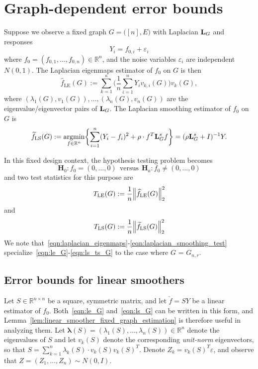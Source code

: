 \documentclass{article}
\newcommand{\Reals}{\mathbb{R}}
\newcommand{\1}{\mathbf{1}}
\DeclareMathOperator*{\argmin}{argmin}
\newcommand{\lambdavec}{\boldsymbol{\lambda}}
\newcommand{\Lap}{{\bf L}}
\newcommand{\Id}{I}
\newcommand{\wt}[1]{\widetilde{#1}}
\newcommand{\wh}[1]{\widehat{#1}}
\newcommand{\LE}{\mathrm{LE}}
\newcommand{\LS}{\mathrm{LS}}
\theoremstyle{alden}
\theoremstyle{aldenthm}
\theoremstyle{definition}
\theoremstyle{remark}
\begin{document}
\section{Graph-dependent error bounds}
\label{sec:fixed_graph_error_bounds}

Suppose we observe a fixed graph $G = \bigl([n],E\bigr)$ with Laplacian $\Lap_G$ and responses
\begin{equation}
\label{eqn:fixed_graph_regression_model}
Y_i = f_{0,i} + \varepsilon_i
\end{equation}
where $f_0 = (f_{0,1},\ldots,f_{0,n}) \in \Reals^n$, and the noise variables $\varepsilon_i$ are independent $N(0,1)$. The Laplacian eigenmaps estimator of $f_0$ on $G$ is then
\begin{equation}
\label{eqn:le_G}
\wh{f}_{\LE}(G) := \sum_{k = 1}^{\kappa} \biggl(\frac{1}{n}\sum_{i = 1}^{n} Y_i v_{k,i}(G) \biggr) v_k(G),
\end{equation}
where $(\lambda_1(G),v_1(G)),\ldots,(\lambda_n(G),v_n(G))$ are the eigenvalue/eigenvector pairs of $\Lap_G$. The Laplacian smoothing estimator of $f_0$ on $G$ is
\begin{equation}
\label{eqn:ls_G}
\wt{f}_{\LS}(G) := \argmin_{f \in \Reals^n} \biggl\{ \sum_{i = 1}^{n}(Y_i - f_i)^2 + \rho \cdot f^T \Lap_G^{s}  f \biggr\} = (\rho \Lap_G^s + \Id)^{-1}Y.
\end{equation}

In this fixed design context, the hypothesis testing problem becomes
\begin{equation*}
\mathbf{H}_0: f_{0} = (0,...,0) ~~\textrm{versus}~~ \mathbf{H}_a: f_{0} \neq (0,...,0)
\end{equation*}
and two test statistics for this purpose are
\begin{equation}
\label{eqn:le_ts_G}
T_{\LE}(G) := \frac{1}{n} \Bigl\|\wh{f}_{\LE}(G)\Bigr\|_2^2 
\end{equation}
and
\begin{equation}
\label{eqn:ls_ts_G}
T_{\LS}(G) := \frac{1}{n} \Bigl\|\wt{f}_{\LS}(G)\Bigr\|_2^2 
\end{equation}
We note that~\eqref{eqn:laplacian_eigenmaps}-\eqref{eqn:laplacian_smoothing_test} specialize~\eqref{eqn:le_G}-\eqref{eqn:ls_ts_G} to the case where $G$ = $G_{n,r}$.

\subsection{Error bounds for linear smoothers}
Let $S \in \Reals^{n \times n}$ be a square, symmetric matrix, and let $\check{f} = SY$ be a linear estimator of $f_0$. Both~\eqref{eqn:le_G} and~\eqref{eqn:ls_G} can be written in this form, and Lemma~\ref{lem:linear_smoother_fixed_graph_estimation} is therefore useful in analyzing them. Let $\lambdavec(S) = (\lambda_1(S),\ldots,\lambda_n(S)) \in \Reals^n$ denote the eigenvalues of $S$ and let $v_k(S)$ denote the corresponding \emph{unit-norm} eigenvectors, so that $S = \sum_{k = 1}^{n} \lambda_k(S) \cdot v_k(S) v_k(S)^T$. Denote $Z_k = v_k(S)^T \varepsilon$, and observe that $Z = (Z_1,\ldots,Z_n) \sim N(0,\Id)$. 
\end{document}
